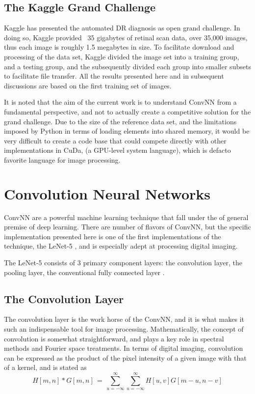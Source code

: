 \documentclass[letterpaper,12pt]{article}
\begin{document}
\subsection{The Kaggle Grand Challenge}

Kaggle has presented the automated DR diagnosis as open grand challenge. In doing so, Kaggle provided ~35 gigabytes of retinal scan data, over 35,000 images, thus each image is roughly 1.5 megabytes in size. To facilitate download and processing of the data set, Kaggle divided the image set into a training group, and a testing group, and the subsequently divided each group into smaller subsets to facilitate file transfer. All the results presented here and in subsequent discussions are based on the first training set of images.

It is noted that the aim of the current work is to understand ConvNN from a fundamental perspective, and not to actually create a competitive solution for the grand challenge. Due to the size of the reference data set, and the limitations imposed by Python in terms of loading elements into shared memory, it would be very difficult to create a code base that could compete directly with other implementations in CuDa, (a GPU-level system language), which is defacto favorite language for image processing.	

\section{Convolution Neural Networks}

ConvNN are a powerful machine learning technique that fall under the of general premise of deep learning. There are number of flavors of ConvNN, but the specific implementation presented here is one of the first implementations of the technique, the LeNet-5 \cite{LeNet}, and is especially adept at processing digital imaging.

The LeNet-5 consists of 3 primary component layers: the convolution layer, the pooling layer, the conventional fully connected layer \cite{deep}. 

\subsection{The Convolution Layer}

The convolution layer is the work horse of the ConvNN, and it is what makes it such an indispensable tool for image processing. Mathematically, the concept of convolution is somewhat straightforward, and plays a key role in spectral methods and Fourier space treatments. In terms of digital imaging, convolution can be expressed as \cite{deep} the product of the pixel intensity of a given image with that of a kernel, and is stated as
\begin{equation}
H[m,n] * G[m,n] \, = \, \sum_{u=- \infty}^{\infty} \sum_{u=- \infty}^{\infty} H[u,v] G[m-u, n-v]
\end{equation}
\end{document}
